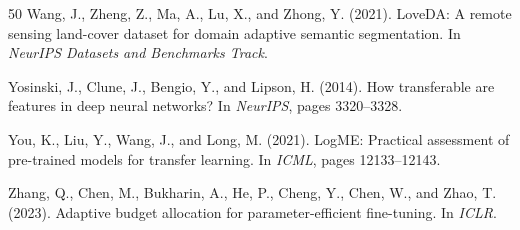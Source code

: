 \documentclass[11pt,a4paper]{report}
\begin{document}
\begin{thebibliography}{50}
Wang, J., Zheng, Z., Ma, A., Lu, X., and Zhong, Y. (2021).
LoveDA: A remote sensing land-cover dataset for domain adaptive semantic segmentation.
In \emph{NeurIPS Datasets and Benchmarks Track}.

Yosinski, J., Clune, J., Bengio, Y., and Lipson, H. (2014).
How transferable are features in deep neural networks?
In \emph{NeurIPS}, pages 3320--3328.

You, K., Liu, Y., Wang, J., and Long, M. (2021).
LogME: Practical assessment of pre-trained models for transfer learning.
In \emph{ICML}, pages 12133--12143.

Zhang, Q., Chen, M., Bukharin, A., He, P., Cheng, Y., Chen, W., and Zhao, T. (2023).
Adaptive budget allocation for parameter-efficient fine-tuning.
In \emph{ICLR}.

\end{thebibliography}
\end{document}
